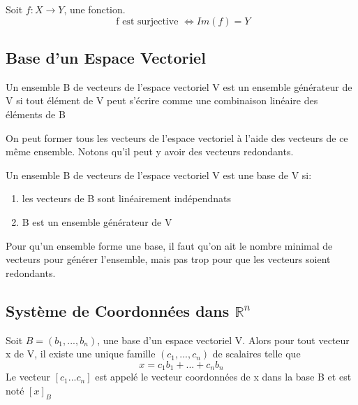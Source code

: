 \documentclass{article}
\begin{document}
\begin{theorem}
    Soit $f:X \rightarrow Y$, une fonction. $$ \text{ f est surjective }
    \Longleftrightarrow Im(f)=Y$$
\end{theorem}

\subsection{Base d'un Espace Vectoriel}

\begin{definition}
    Un ensemble B de vecteurs de l'espace vectoriel V est un ensemble
    générateur de V si tout élément de V peut s'écrire comme une combinaison
    linéaire des éléments de B
\end{definition}

\begin{intuition}
    On peut former tous les vecteurs de l'espace vectoriel à l'aide des
    vecteurs de ce même ensemble. Notons qu'il peut y avoir des vecteurs
    redondants.
\end{intuition}

\begin{definition}
    Un ensemble B de vecteurs de l'espace vectoriel V est une base de V
    si:
    \begin{enumerate}
	\item les vecteurs de B sont linéairement indépendnats
	\item B est un ensemble générateur de V
    \end{enumerate}
\end{definition}

\begin{remark}
    Pour qu'un ensemble forme une base, il faut qu'on ait le nombre
    minimal de vecteurs pour générer l'ensemble, mais pas trop pour
    que les vecteurs soient redondants.
\end{remark}

\subsection{Système de Coordonnées dans $\mathbb{R}^n$}

\begin{definition}
    Soit $B=(b_1, ... , b_n)$, une base d'un espace vectoriel V. Alors
    pour tout vecteur x de V, il existe une unique famille $(c_1, ...,
    c_n)$ de scalaires telle que $$x= c_1 b_1 + ... + c_n b_n$$
    Le vecteur $[c_1 ... c_n]$ est appelé le vecteur coordonnées de x
    dans la base B et est noté $[x]_B$
\end{definition}
\end{document}
